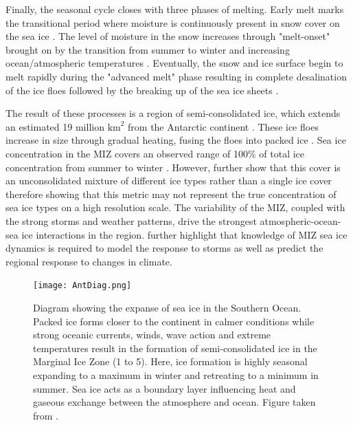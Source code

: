 Finally, the seasonal cycle closes with three phases of melting. Early melt marks the transitional period  where moisture is continuously present in snow cover on the sea ice \cite{barber2005microwave}. The level of moisture in the snow increases through "melt-onset" brought on by the transition from summer to winter and increasing ocean/atmospheric temperatures \cite{barber2005microwave}. Eventually, the snow and ice surface begin to melt rapidly during the "advanced melt" phase resulting in complete desalination of the ice floes followed by the breaking up of the sea ice sheets \cite{barber2005microwave}. 

The result of these processes is a region of semi-consolidated ice, which extends an estimated 19 million $\text{km}^2$ from the Antarctic continent \cite{MAKSYM2012seaiceextent}. These ice floes increase in size through gradual heating, fusing the floes into packed ice \cite{arrigo2004large}. Sea ice concentration in the MIZ covers an observed range of 100\% of total ice concentration from summer to winter \cite{alberello2019drift}. However, \textcite{alberello2019drift} further show that this cover is an unconsolidated mixture of different ice types rather than a single ice cover therefore showing that this metric may not represent the true concentration of sea ice types on a high resolution scale. The variability of the MIZ, coupled with the strong storms and weather patterns, drive the strongest atmospheric-ocean-sea ice interactions in the region. \textcite{alberello2019drift} further highlight that knowledge of MIZ sea ice dynamics is required to model the response to storms as well as predict the regional response to changes in climate.

\begin{figure}[H]
	\centering
	\texttt{[image: AntDiag.png]}
	\caption{Diagram showing the expanse of sea ice in the Southern Ocean. Packed ice forms closer to the continent in calmer conditions while strong oceanic currents, winds, wave action and extreme temperatures result in the formation of semi-consolidated ice in the Marginal Ice Zone (1 to 5). Here, ice formation is highly seasonal expanding to a maximum in winter and retreating to a minimum in summer. Sea ice acts as a boundary layer influencing heat and gaseous  exchange between the atmosphere and ocean. Figure taken from \textcite{Antseaice}.}
	\label{fig:AntaDiag}
\end{figure}

